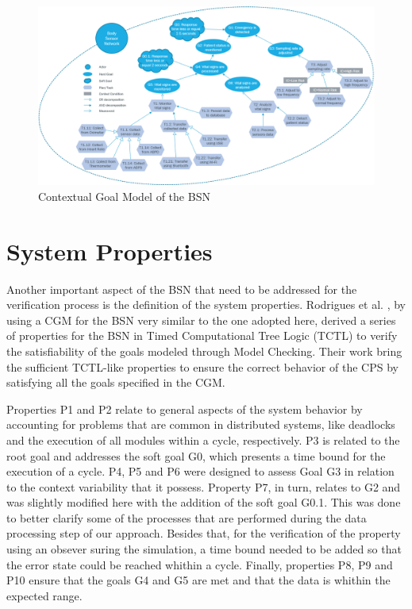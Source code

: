 \begin{figure}[!h]
	\centering
	\includegraphics[width=1\textwidth, keepaspectratio]{img/cgm_bsn.png}
	\caption{Contextual Goal Model of the BSN \cite{seams2018}}
	\label{fig:BSN-CGM}
\end{figure}

\section{System Properties}

Another important aspect of the BSN that need to be addressed for the verification process is the definition of the system properties. Rodrigues et al. \cite{seams2018}, by using a CGM for the BSN very similar to the one adopted here, derived a series of properties for the BSN in Timed Computational Tree Logic (TCTL) \cite{henzinger1994symbolic} to verify the satisfiability of the goals modeled through Model Checking. Their work
bring the sufficient TCTL-like properties to ensure the correct behavior of the CPS by satisfying all the goals specified in the CGM. 

Properties P1 and P2 relate to general aspects of the system behavior by accounting for problems that are common in distributed systems, like deadlocks and the execution of all modules within a cycle, respectively. P3 is related to the root goal and addresses the soft goal G0, which presents a time bound for the execution of a cycle.  P4, P5 and P6 were designed to assess Goal G3 in relation to the context variability that it possess. Property P7, in turn, relates to G2 and was slightly modified here with the addition of the soft goal G0.1. This was done to better clarify some of the processes that are performed during the data processing step of our approach. Besides that, for the verification of the property using an obsever suring the simulation, a time bound needed to be added so that the error state could be reached whithin a cycle. Finally, properties P8, P9 and P10 ensure that the goals G4 and G5 are met and that the data is whithin the expected range.


